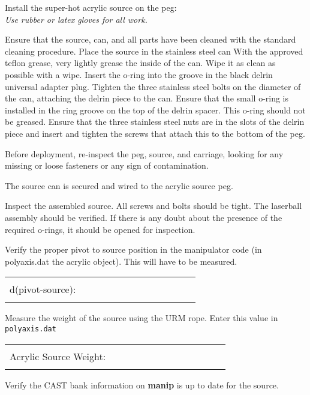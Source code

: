 \begin{enumerate}

  
\checkitem Install the super-hot acrylic source on the peg:\\
  {\em Use rubber or latex gloves for all work.}
  \begin{enumerate}
  \checkitem  Ensure that the source, can, and all parts have been 
    cleaned with the standard cleaning procedure.
  \checkitem  Place the source in the stainless steel can
  \checkitem  With the approved teflon grease, very lightly grease the 
    inside of the can.  Wipe it as clean as possible with a wipe.  Insert 
    the o-ring into the groove in the black delrin universal adapter plug.
  \checkitem Tighten the three stainless steel bolts on the diameter 
      of the can, attaching the delrin piece to the can.
  \checkitem  Ensure that the small o-ring is installed in the ring 
      groove on the top
      of the delrin spacer.  This o-ring should not be greased.
  \checkitem  Ensure that the three stainless steel nuts are in the slots 
    of the delrin piece and insert and tighten the screws that attach this 
    to the bottom of the peg.
  \end{enumerate}
  Before deployment, re-inspect the peg, source, and carriage, looking for any
  missing or loose fasteners or any sign of contamination.
 
\checkitem The source can is secured and wired to the acrylic source peg.
  
\checkitem Inspect the assembled source.  All screws and bolts should be
    tight.  The laserball assembly should be verified.  If there
    is any doubt about the presence of the required o-rings, it should
    be opened for inspection.
  
\checkitem Verify the proper pivot to source position in the manipulator code
    (in polyaxis.dat the acrylic object).
    This will have to be measured.
     \begin{center}
     \begin{tabular}{|l|}
     \hline
      \\
     d(pivot-source):~~~~~~~~~~~~~~~~~~~~~~~~\\
      \\
     \hline
     \end{tabular}
     \end{center}
 \checkitem Measure the weight of the source using the URM rope.  Enter
  this value in {\tt polyaxis.dat}
     \begin{center}
     \begin{tabular}{|l|}
     \hline
      \\
     Acrylic Source Weight:~~~~~~~~~~~~~~~~~~~~~~~~\\
      \\
     \hline
     \end{tabular}
     \end{center}
 \checkitem Verify the CAST bank information on {\bf manip} is up to date
  for the source.
  

\end{enumerate}

